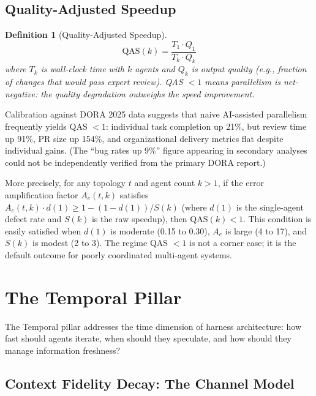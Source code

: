 \documentclass[11pt, a4paper, logo, copyright]{googledeepmind}
\newtheorem{definition}{Definition}[section]
\begin{document}
\subsection{Quality-Adjusted Speedup}

\begin{definition}[Quality-Adjusted Speedup]
\label{def:qas}
\begin{equation}
    \text{QAS}(k) = \frac{T_1 \cdot Q_1}{T_k \cdot Q_k}
\end{equation}
where $T_k$ is wall-clock time with $k$ agents and $Q_k$ is output quality (e.g., fraction of changes that would pass expert review). QAS $< 1$ means parallelism is net-negative: the quality degradation outweighs the speed improvement.
\end{definition}

Calibration against DORA 2025 data suggests that naive AI-assisted parallelism frequently yields QAS $< 1$: individual task completion up 21\%, but review time up 91\%, PR size up 154\%, and organizational delivery metrics flat despite individual gains. (The ``bug rates up 9\%'' figure appearing in secondary analyses could not be independently verified from the primary DORA report.)

More precisely, for any topology $t$ and agent count $k > 1$, if the error amplification factor $A_e(t,k)$ satisfies $A_e(t, k) \cdot d(1) \geq 1 - (1 - d(1))/S(k)$ (where $d(1)$ is the single-agent defect rate and $S(k)$ is the raw speedup), then QAS$(k) < 1$. This condition is easily satisfied when $d(1)$ is moderate (0.15 to 0.30), $A_e$ is large (4 to 17), and $S(k)$ is modest (2 to 3). The regime QAS $< 1$ is not a corner case; it is the default outcome for poorly coordinated multi-agent systems.


\section{The Temporal Pillar}
\label{sec:temporal}

The Temporal pillar addresses the time dimension of harness architecture: how fast should agents iterate, when should they speculate, and how should they manage information freshness?

\subsection{Context Fidelity Decay: The Channel Model}
\end{document}
